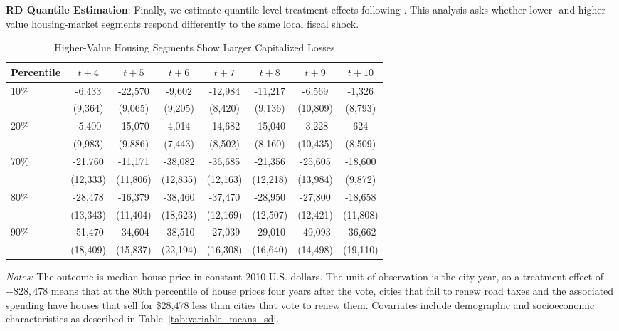 \textbf{RD Quantile Estimation}: Finally, we estimate quantile-level treatment effects following \cite{FRANDSEN2012}. This analysis asks whether lower- and higher-value housing-market segments respond differently to the same local fiscal shock.

\begin{table}[H]
    \centering
    \caption{Higher-Value Housing Segments Show Larger Capitalized Losses}
    \label{tab:quantile_tes}
    \begin{threeparttable}
    \begin{minipage}{\linewidth}
    \centering
    \begin{tabular}{p{1.5cm}ccccccc}
        \hline
        Percentile & $t + 4$ & $t + 5$ & $t + 6$ & $t + 7$ & $t + 8$ & $t + 9$ & $t + 10$ \\
        \hline
        10\% & -6,433 & -22,570 & -9,602 & -12,984 & -11,217 & -6,569 & -1,326 \\
             & (9,364) & (9,065) & (9,205) & (8,420) & (9,136) & (10,809) & (8,793) \\
        20\% & -5,400 & -15,070 & 4,014 & -14,682 & -15,040 & -3,228 & 624 \\
             & (9,983) & (9,886) & (7,443) & (8,502) & (8,160) & (10,435) & (8,509) \\
        70\% & -21,760 & -11,171 & -38,082 & -36,685 & -21,356 & -25,605 & -18,600 \\
             & (12,333) & (11,806) & (12,835) & (12,163) & (12,218) & (13,984) & (9,872) \\
        80\% & -28,478 & -16,379 & -38,460 & -37,470 & -28,950 & -27,800 & -18,658 \\
             & (13,343) & (11,404) & (18,623) & (12,169) & (12,507) & (12,421) & (11,808) \\
        90\% & -51,470 & -34,604 & -38,510 & -27,039 & -29,010 & -49,093 & -36,662 \\
             & (18,409) & (15,837) & (22,194) & (16,308) & (16,640) & (14,498) & (19,110) \\
        \hline
    \end{tabular}
    \vspace{0.5em}
    \begin{tablenotes}[flushleft]
        \small
        \item \textit{Notes:} The outcome is median house price in constant 2010 U.S. dollars. The unit of observation is the city-year, so a treatment effect of \(-\$28{,}478\) means that at the 80th percentile of house prices four years after the vote, cities that fail to renew road taxes and the associated spending have houses that sell for \$28,478 less than cities that vote to renew them. Covariates include demographic and socioeconomic characteristics as described in Table~\ref{tab:variable_means_sd}.
    \end{tablenotes}
    \end{minipage}
    \end{threeparttable}
\end{table}


